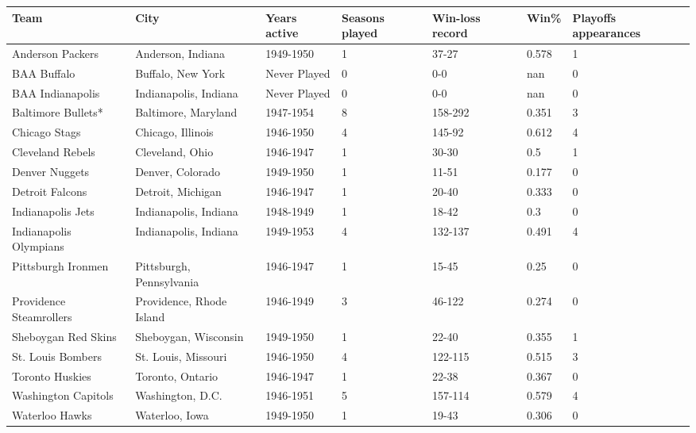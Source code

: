 \documentclass{article}
\begin{document}
\begin{tabular}{lllllll}
\toprule
Team & City & Years active & Seasons played & Win-loss record & Win\% & Playoffs appearances \\
\midrule
Anderson Packers & Anderson, Indiana & 1949-1950 & 1 & 37-27 & 0.578 & 1 \\
BAA Buffalo & Buffalo, New York & Never Played & 0 & 0-0 & nan & 0 \\
BAA Indianapolis & Indianapolis, Indiana & Never Played & 0 & 0-0 & nan & 0 \\
Baltimore Bullets* & Baltimore, Maryland & 1947-1954 & 8 & 158-292 & 0.351 & 3 \\
Chicago Stags & Chicago, Illinois & 1946-1950 & 4 & 145-92 & 0.612 & 4 \\
Cleveland Rebels & Cleveland, Ohio & 1946-1947 & 1 & 30-30 & 0.5 & 1 \\
Denver Nuggets & Denver, Colorado & 1949-1950 & 1 & 11-51 & 0.177 & 0 \\
Detroit Falcons & Detroit, Michigan & 1946-1947 & 1 & 20-40 & 0.333 & 0 \\
Indianapolis Jets & Indianapolis, Indiana & 1948-1949 & 1 & 18-42 & 0.3 & 0 \\
Indianapolis Olympians & Indianapolis, Indiana & 1949-1953 & 4 & 132-137 & 0.491 & 4 \\
Pittsburgh Ironmen & Pittsburgh, Pennsylvania & 1946-1947 & 1 & 15-45 & 0.25 & 0 \\
Providence Steamrollers & Providence, Rhode Island & 1946-1949 & 3 & 46-122 & 0.274 & 0 \\
Sheboygan Red Skins & Sheboygan, Wisconsin & 1949-1950 & 1 & 22-40 & 0.355 & 1 \\
St. Louis Bombers & St. Louis, Missouri & 1946-1950 & 4 & 122-115 & 0.515 & 3 \\
Toronto Huskies & Toronto, Ontario & 1946-1947 & 1 & 22-38 & 0.367 & 0 \\
Washington Capitols & Washington, D.C. & 1946-1951 & 5 & 157-114 & 0.579 & 4 \\
Waterloo Hawks & Waterloo, Iowa & 1949-1950 & 1 & 19-43 & 0.306 & 0 \\
\bottomrule
\end{tabular}
\end{document}
